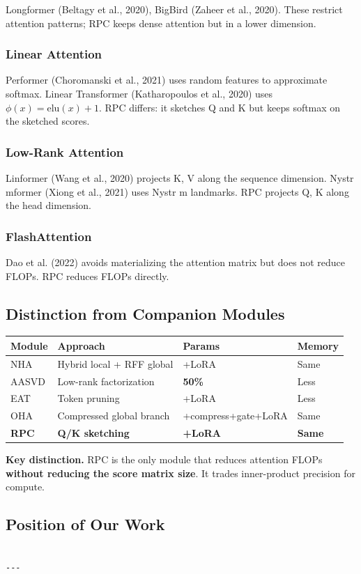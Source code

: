 Longformer (Beltagy et al., 2020), BigBird (Zaheer et al., 2020). These 
restrict attention patterns; RPC keeps dense attention but in a lower 
dimension.

\subsubsection{Linear Attention}

Performer (Choromanski et al., 2021) uses random features to approximate 
softmax. Linear Transformer (Katharopoulos et al., 2020) uses $\phi(x) = \text{elu}(x) + 1$. 
RPC differs: it sketches Q and K but keeps softmax on the sketched scores.

\subsubsection{Low-Rank Attention}

Linformer (Wang et al., 2020) projects K, V along the sequence dimension. 
Nystr mformer (Xiong et al., 2021) uses Nystr m landmarks. RPC projects 
Q, K along the head dimension.

\subsubsection{FlashAttention}

Dao et al. (2022) avoids materializing the attention matrix but does not 
reduce FLOPs. RPC reduces FLOPs directly.

\subsection{Distinction from Companion Modules}

\begin{table}[H]
\centering
\small
\begin{tabular}{llll}
\toprule
\textbf{Module} & \textbf{Approach} & \textbf{Params} & \textbf{Memory} \\
\midrule
NHA & Hybrid local + RFF global & +LoRA & Same \\
AASVD & Low-rank factorization & \textbf{ 50\%} & Less \\
EAT & Token pruning & +LoRA & Less \\
OHA & Compressed global branch & +compress+gate+LoRA & Same \\
\textbf{RPC} & \textbf{Q/K sketching} & \textbf{+LoRA} & \textbf{Same} \\
\bottomrule
\end{tabular}
\end{table}

\textbf{Key distinction.} RPC is the only module that reduces attention FLOPs 
\textbf{without reducing the score matrix size}. It trades inner-product 
precision for compute.

\subsection{Position of Our Work}

\begin{lstlisting}

---
\end{lstlisting}